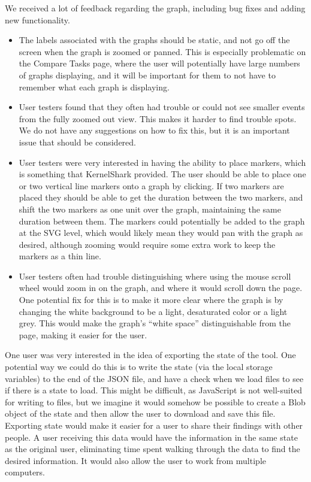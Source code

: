 \documentclass{hmcclinic}
\begin{document}
We received a lot of feedback regarding the graph, including bug fixes and adding new functionality.
  \begin{itemize}

  \item The labels associated with the graphs should be static, and not go off the screen when 
  the graph is zoomed or panned. This is especially problematic on the Compare Tasks page, 
  where the user will potentially have large numbers of graphs displaying, and it will be 
  important for them to not have to remember what each graph is displaying.

  \item User testers found that they often had trouble or could not see smaller events 
  from the fully zoomed out view. This makes it harder to find trouble spots. We do not 
  have any suggestions on how to fix this, but it is an important issue that should be 
  considered.

  \item User testers were very interested in having the ability to place markers, which 
  is something that KernelShark provided. The user should be able to place one or two
   vertical line markers onto a graph by clicking. If two markers are placed they should
    be able to get the duration between the two markers, and shift the two markers as one
     unit over the graph, maintaining the same duration between them. The markers could
      potentially be added to the graph at the SVG level, which would likely mean they 
      would pan with the graph as desired, although zooming would require some extra 
      work to keep the markers as a thin line.

  \item User testers often had trouble distinguishing where using the mouse scroll wheel
   would zoom in on the graph, and where it would scroll down the page. One potential fix
    for this is to make it more clear where the graph is by changing the white background
     to be a light, desaturated color or a light grey. This would make the
     graph's ``white
      space'' distinguishable from the page, making it easier for the user.

  \end{itemize}

One user was very interested in the idea of exporting the state of the tool. One
potential way we could do this is to write the state (via the local storage
variables) to the end of the JSON file, and have a check when we load files to
see if there is a state to load. This might be difficult, as JavaScript is not
well-suited for writing to files, but we imagine it would somehow be possible to
create a Blob object of the state and then allow the user to download and save
this file.  Exporting state would make it easier for a user to share their
findings with other people. A user receiving this data would have the
information in the same state as the original user, eliminating time spent
walking through the data to find the desired information. It would also allow
the user to work from multiple computers.
\end{document}
